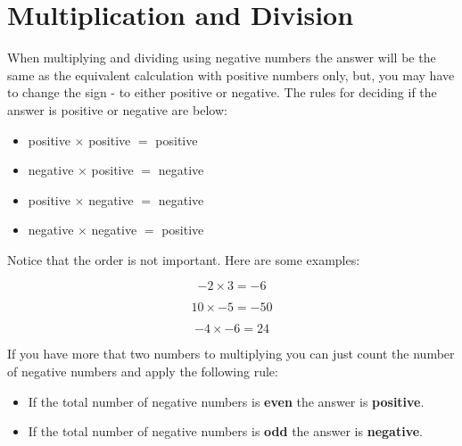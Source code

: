 \documentclass[
  a4paper,
]{scrbook}
\providecommand{\tightlist}{%
  \setlength{\itemsep}{0pt}\setlength{\parskip}{0pt}}\usepackage{longtable,booktabs,array}
\begin{document}
\hypertarget{multiplication-and-division}{%
\section{Multiplication and
Division}\label{multiplication-and-division}}

When multiplying and dividing using negative numbers the answer will be
the same as the equivalent calculation with positive numbers only, but,
you may have to change the sign - to either positive or negative. The
rules for deciding if the answer is positive or negative are below:

\begin{tcolorbox}[enhanced jigsaw, opacityback=0, left=2mm, toptitle=1mm, title=\textcolor{quarto-callout-note-color}{\faInfo}\hspace{0.5em}{Note}, breakable, colbacktitle=quarto-callout-note-color!10!white, opacitybacktitle=0.6, bottomtitle=1mm, arc=.35mm, colback=white, leftrule=.75mm, bottomrule=.15mm, colframe=quarto-callout-note-color-frame, rightrule=.15mm, titlerule=0mm, toprule=.15mm, coltitle=black]

\begin{itemize}
\tightlist
\item
  positive \(\times\) positive \(=\) positive
\item
  negative \(\times\) positive \(=\) negative
\item
  positive \(\times\) negative \(=\) negative
\item
  negative \(\times\) negative \(=\) positive
\end{itemize}

\end{tcolorbox}

Notice that the order is not important. Here are some examples:

\[
-2 \times 3 = -6
\]

\[
10 \times -5 = -50 
\]

\[
-4 \times -6 = 24 
\]

If you have more that two numbers to multiplying you can just count the
number of negative numbers and apply the following rule:

\begin{tcolorbox}[enhanced jigsaw, opacityback=0, left=2mm, toptitle=1mm, title=\textcolor{quarto-callout-note-color}{\faInfo}\hspace{0.5em}{Note}, breakable, colbacktitle=quarto-callout-note-color!10!white, opacitybacktitle=0.6, bottomtitle=1mm, arc=.35mm, colback=white, leftrule=.75mm, bottomrule=.15mm, colframe=quarto-callout-note-color-frame, rightrule=.15mm, titlerule=0mm, toprule=.15mm, coltitle=black]

\begin{itemize}
\tightlist
\item
  If the total number of negative numbers is \textbf{even} the answer is
  \textbf{positive}.
\item
  If the total number of negative numbers is \textbf{odd} the answer is
  \textbf{negative}.
\end{itemize}

\end{tcolorbox}
\end{document}
